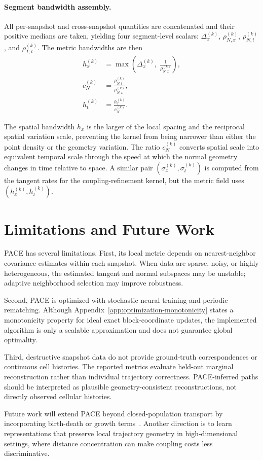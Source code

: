 \paragraph{Segment bandwidth assembly.}
All per-snapshot and cross-snapshot quantities are concatenated and their positive medians are taken, yielding four segment-level scalars: $\Delta_x^{(k)}$, $\rho_{N,x}^{(k)}$, $\rho_{N,t}^{(k)}$, and $\rho_{T,t}^{(k)}$. The metric bandwidths are then
\begin{align}
    h_x^{(k)} &= \max\!\left(\Delta_x^{(k)},\; \frac{1}{\rho_{N,x}^{(k)}}\right), \\
    c_N^{(k)} &= \frac{\rho_{N,t}^{(k)}}{\rho_{N,x}^{(k)}}, \\
    h_t^{(k)} &= \frac{h_x^{(k)}}{c_N^{(k)}}.
\end{align}

The spatial bandwidth $h_x$ is the larger of the local spacing and the reciprocal spatial variation scale, preventing the kernel from being narrower than either the point density or the geometry variation. The ratio $c_N^{(k)}$ converts spatial scale into equivalent temporal scale through the speed at which the normal geometry changes in time relative to space. A similar pair $(\sigma_x^{(k)}, \sigma_t^{(k)})$ is computed from the tangent rates for the coupling-refinement kernel, but the metric field uses $(h_x^{(k)}, h_t^{(k)})$.

\section{Limitations and Future Work}
\label{app:limitations}

PACE has several limitations. First, its local metric depends on nearest-neighbor covariance estimates within each snapshot. When data are sparse, noisy, or highly heterogeneous, the estimated tangent and normal subspaces may be unstable; adaptive neighborhood selection may improve robustness.

Second, PACE is optimized with stochastic neural training and periodic rematching. Although Appendix~\ref{app:optimization-monotonicity} states a monotonicity property for ideal exact block-coordinate updates, the implemented algorithm is only a scalable approximation and does not guarantee global optimality.

Third, destructive snapshot data do not provide ground-truth correspondences or continuous cell histories. The reported metrics evaluate held-out marginal reconstruction rather than individual trajectory correctness. PACE-inferred paths should be interpreted as plausible geometry-consistent reconstructions, not directly observed cellular histories.

Future work will extend PACE beyond closed-population transport by incorporating birth-death or growth terms~\citep{schiebinger2019optimal}. Another direction is to learn representations that preserve local trajectory geometry in high-dimensional settings, where distance concentration can make coupling costs less discriminative.
